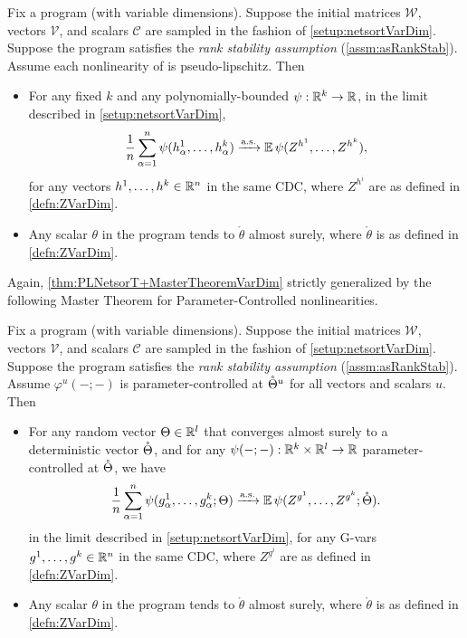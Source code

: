 \documentclass[main.tex]{subfiles}
\begin{document}
\begin{thm}
    \label{thm:PLNetsorT+MasterTheoremVarDim} Fix a \netsort{} program (with variable dimensions). Suppose the initial matrices $\mathcal{W}$, vectors $\mathcal{V}$, and scalars $\mathcal{C}$ are sampled in the fashion of \cref{setup:netsortVarDim}.
    Suppose the program satisfies the \emph{rank stability assumption} (\cref{assm:asRankStab}).
    Assume each nonlinearity of  is pseudo-lipschitz.
    Then 
    \begin{itemize}
        \item For any fixed $k$ and any polynomially-bounded $\psi:\mathbb{R}^{k}\to\mathbb{R}$, in the limit described in \cref{setup:netsortVarDim},
        \[
        \frac{1}{n}\sum_{\alpha=1}^{n}\psi(h_{\alpha}^{1},\ldots,h_{\alpha}^{k})\xrightarrow{\mathrm{a.s.}}\operatorname*{\mathbb{E}}\psi(Z^{h^{1}},\ldots,Z^{h^{k}}),
        \]
        for any vectors $h^{1},\ldots,h^{k} \in \mathbb{R}^n$ in the same CDC, where $Z^{h^{i}}$ are as defined in \cref{defn:ZVarDim}.
        \item Any scalar $\theta$ in the program tends to $\mathring{\theta}$ almost surely, where $\mathring{\theta}$ is as defined in \cref{defn:ZVarDim}.
    \end{itemize}
\end{thm}

Again, \cref{thm:PLNetsorT+MasterTheoremVarDim} strictly generalized by the following Master Theorem for Parameter-Controlled nonlinearities.

\begin{thm}
    \label{thm:PCNetsorT+MasterTheoremVarDim} Fix a \netsort{} program (with variable dimensions). Suppose the initial matrices $\mathcal{W}$, vectors $\mathcal{V}$, and scalars $\mathcal{C}$ are sampled in the fashion of \cref{setup:netsortVarDim}.
    Suppose the program satisfies the \emph{rank stability assumption} (\cref{assm:asRankStab}).
    Assume $\varphi^u(-;-)$ is parameter-controlled at $\mathring {\Theta}^u$ for all vectors and scalars $u$.
    Then 
    \begin{itemize}
        \item 
        For any random vector $\Theta \in \mathbb{R}^l$ that converges almost surely to a deterministic vector $\mathring{\Theta}$, and for any $\psi(-; -): \mathbb{R}^k \times \mathbb{R}^l \to \mathbb{R}$ parameter-controlled at $\mathring{\Theta}$, we have
        \begin{align*}
            \frac{1}{n} \sum_{\alpha=1}^n \psi(g^1_\alpha, \ldots, g^k_\alpha; \Theta) \xrightarrow{\mathrm{a.s.}} \operatorname*{\mathbb{E}}\psi(Z^{g^1}, \ldots, Z^{g^k}; \mathring{\Theta}).
        \end{align*}
        in the limit described in \cref{setup:netsortVarDim},
        for any G-vars $g^1, \ldots, g^k \in \mathbb{R}^n$ in the same CDC,
        where $Z^{g^{i}}$ are as defined in \cref{defn:ZVarDim}.
        \item Any scalar $\theta$ in the program tends to $\mathring{\theta}$ almost surely, where $\mathring{\theta}$ is as defined in \cref{defn:ZVarDim}.
    \end{itemize}
\end{thm}
\end{document}
